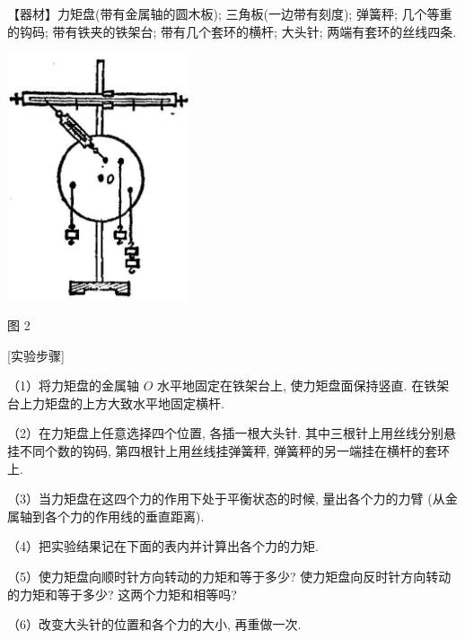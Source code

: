 \documentclass[10pt]{article}
\begin{document}
【器材】力矩盘(带有金属轴的圆木板); 三角板(一边带有刻度); 弹簧秤; 几个等重的钩码; 带有铁夹的铁架台; 带有几个套环的横杆; 大头针; 两端有套环的丝线四条.

\begin{center}
\includegraphics[max width=0.4\textwidth]{images/01912d55-147c-70aa-b0e0-1782a122f948_315_118656.jpg}
\end{center}

图 2

[实验步骤]

（1）将力矩盘的金属轴 \(O\) 水平地固定在铁架台上, 使力矩盘面保持竖直. 在铁架台上力矩盘的上方大致水平地固定横杆.

（2）在力矩盘上任意选择四个位置, 各插一根大头针. 其中三根针上用丝线分别悬挂不同个数的钩码, 第四根针上用丝线挂弹簧秤, 弹簧秤的另一端挂在横杆的套环上.

（3）当力矩盘在这四个力的作用下处于平衡状态的时候, 量出各个力的力臂 (从金属轴到各个力的作用线的垂直距离).

（4）把实验结果记在下面的表内并计算出各个力的力矩.

\begin{center}
\end{center}

（5）使力矩盘向顺时针方向转动的力矩和等于多少? 使力矩盘向反时针方向转动的力矩和等于多少? 这两个力矩和相等吗?

（6）改变大头针的位置和各个力的大小, 再重做一次.
\end{document}
